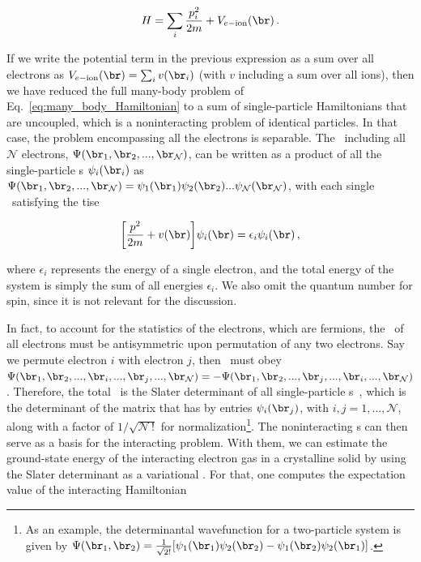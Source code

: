 \begin{equation}
    \label{eq:single_particle_Hamiltonian}
    H = \sum_i  \frac{p_i^2}{2 m} + V_{e-\mathrm{ion}}(\br) \,.
\end{equation}

\noindent If we write the potential term in the previous expression as a sum over all electrons as $V_{e-\mathrm{ion}}(\br) = \sum_i v (\br_i)$ (with $v$ including a sum over all ions), then we have reduced the full many-body problem of Eq.~\eqref{eq:many_body_Hamiltonian} to a sum of single-particle Hamiltonians that are uncoupled, which is a noninteracting problem of identical particles.
In that case, the problem encompassing all the electrons is separable.
The \wf~including all $\mathcal{N}$ electrons, $\Psi(\br_1,\br_2,...,\br_{\mathcal{N}})$, can be written as a product of all the single-particle \wf s $\psi_i(\br_i)$ as $\Psi(\br_1,\br_2,...,\br_{\mathcal{N}})= \psi_1(\br_1) \psi_2(\br_2)...\psi_{\mathcal{N}}(\br_{\mathcal{N}})$, with each single \wf~satisfying the \gls{tise}


\begin{equation}
    \label{eq:single_particle_Schrodinger_equation}
    \left[ \frac{p^2}{2 m} + v(\br) \right]\! \psi_i(\br) = \epsilon_i \psi_i(\br)\,,
\end{equation}

\noindent where $\epsilon_i$ represents the energy of a single electron, and the total energy of the system is simply the sum of all energies $\epsilon_i$.
We also omit the quantum number for spin, since it is not relevant for the discussion.

In fact, to account for the statistics of the electrons, which are fermions, the \wf~of all electrons must be antisymmetric upon permutation of any two electrons.
Say we permute electron $i$ with electron $j$, then \wf~must obey $\Psi(\br_1,\br_2,...,\br_i,...,\br_j,...,\br_{\mathcal{N}}) = -\Psi(\br_1,\br_2,...,\br_j,...,\br_i,...,\br_{\mathcal{N}})$.
Therefore, the total \wf~is the Slater determinant of all single-particle \wf s~\cite{Griffiths_QM_2018}, which is the determinant of the matrix that has by entries $\psi_i(\br_j)$, with $i,j=1,...,\mathcal{N}$, along with a factor of $1/\sqrt{\mathcal{N}\,!}$ for normalization\footnote{As an example, the determinantal wavefunction for a two-particle system is given by $\Psi(\br_1,\br_2) = \frac{1}{\sqrt{2!}}[\psi_1(\br_1) \psi_2(\br_2) - \psi_1(\br_2) \psi_2(\br_1)]$.}.
The noninteracting \wf s can then serve as a basis for the interacting problem.
With them, we can estimate the ground-state energy of the interacting electron gas in a crystalline solid by using the Slater determinant as a variational \wf.
For that, one computes the expectation value of the interacting Hamiltonian

